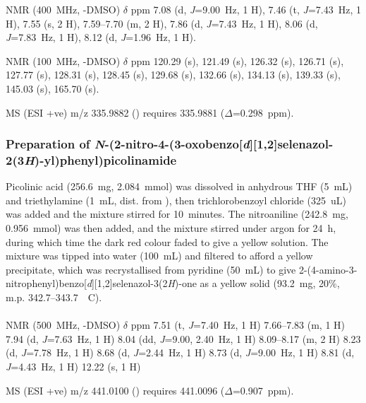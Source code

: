 \begin{refsection}
 NMR (400~MHz, -DMSO) $\delta$ ppm
7.08 (d, \emph{J}=9.00~Hz, 1 H),
7.46 (t, \emph{J}=7.43~Hz, 1 H),
7.55 (s, 2 H),
7.59--7.70 (m, 2 H),
7.86 (d, \emph{J}=7.43~Hz, 1 H),
8.06 (d, \emph{J}=7.83~Hz, 1 H),
8.12 (d, \emph{J}=1.96~Hz, 1 H).

 NMR (100~MHz, -DMSO) $\delta$ ppm
120.29 (s),
121.49 (s),
126.32 (s),
126.71 (s),
127.77 (s),
128.31 (s),
128.45 (s),
129.68 (s),
132.66 (s),
134.13 (s),
139.33 (s),
145.03 (s),
165.70 (s).

MS (ESI +ve) m/z 335.9882 ()  requires 335.9881 ($\Delta$=0.298~ppm).

\normalsize


\subsubsection[Preparation of \refcmpd{ebs-3no2-4nh-2py}]{Preparation of \emph{N}-(2-nitro-4-(3-oxobenzo[\emph{d}][1,2]selenazol-2(3\emph{H})-yl)phenyl)picolinamide }
Picolinic acid (256.6~mg, 2.084~mmol) was dissolved in anhydrous THF (5~mL) and triethylamine (1~mL, dist. from ), then trichlorobenzoyl chloride (325~uL) was added and the mixture stirred for 10~minutes.
The nitroaniline  (242.8~mg, 0.956~mmol) was then added, and the mixture stirred under argon for 24~h, during which time the dark red colour faded to give a yellow solution.
The mixture was tipped into water (100~mL) and filtered to afford a yellow precipitate, which was recrystallised from pyridine (50~mL) to give 2-(4-amino-3-nitrophenyl)benzo[\emph{d}][1,2]selenazol-3(2\emph{H})-one  as a yellow solid (93.2~mg, 20\%, m.p. 342.7--343.7~\degree~C).

\footnotesize\paragraph{}

 NMR (500~MHz, -DMSO) $\delta$ ppm
7.51 (t, \emph{J}=7.40~Hz, 1 H)
7.66--7.83 (m, 1 H)
7.94 (d, \emph{J}=7.63~Hz, 1 H)
8.04 (dd, \emph{J}=9.00, 2.40~Hz, 1 H)
8.09--8.17 (m, 2 H)
8.23 (d, \emph{J}=7.78~Hz, 1 H)
8.68 (d, \emph{J}=2.44~Hz, 1 H)
8.73 (d, \emph{J}=9.00~Hz, 1 H)
8.81 (d, \emph{J}=4.43~Hz, 1 H)
12.22 (s, 1 H)

MS (ESI +ve) m/z 441.0100 ()  requires 441.0096 ($\Delta$=0.907~ppm).


\end{refsection}
